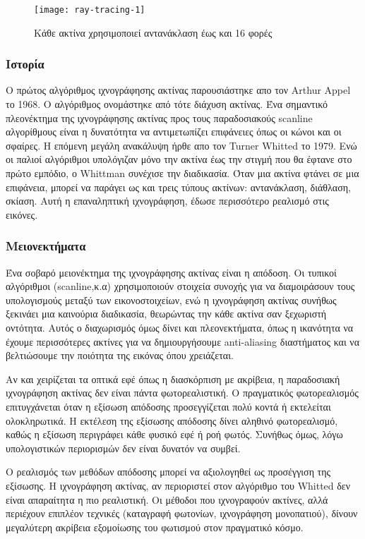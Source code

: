 \begin{figure}[h]
\centering
\texttt{[image: ray-tracing-1]}
\caption{Κάθε ακτίνα χρησιμοποιεί αντανάκλαση έως και 16 φορές}
\end{figure}

\subsubsection{Ιστορία}
Ο πρώτος αλγόριθμος ιχνογράφησης ακτίνας παρουσιάστηκε απο τον Arthur Appel το 1968. Ο αλγόριθμος ονομάστηκε από τότε διάχυση ακτίνας. Ένα σημαντικό πλεονέκτημα της ιχνογράφησης ακτίνας προς τους παραδοσιακούς scanline αλγορίθμους είναι η δυνατότητα να αντιμετωπίζει επιφάνειες όπως οι κώνοι και οι σφαίρες. Η επόμενη μεγάλη ανακάλυψη ήρθε απο τον Turner Whitted το 1979. Ενώ οι παλιοί αλγόριθμοι υπολόγιζαν μόνο την ακτίνα έως την στιγμή που θα έφτανε στο πρώτο εμπόδιο, ο Whittman συνέχισε την διαδικασία. Όταν μια ακτίνα φτάνει σε μια επιφάνεια, μπορεί να παράγει ως και τρεις τύπους ακτίνων: αντανάκλαση, διάθλαση, σκίαση. Αυτή η επαναληπτική ιχνογράφηση, έδωσε περισσότερο ρεαλισμό στις εικόνες.

\subsubsection{Μειονεκτήματα}
Ένα σοβαρό μειονέκτημα της ιχνογράφησης ακτίνας είναι η απόδοση. Οι τυπικοί αλγόριθμοι (scanline,κ.α) χρησιμοποιούν στοιχεία συνοχής για να διαμοιράσουν τους υπολογισμούς μεταξύ των εικονοστοιχείων, ενώ η ιχνογράφηση ακτίνας συνήθως ξεκινάει μια καινούρια διαδικασία, θεωρώντας την κάθε ακτίνα σαν ξεχωριστή οντότητα. Αυτός ο διαχωρισμός όμως δίνει και πλεονεκτήματα, όπως η ικανότητα να έχουμε περισσότερες ακτίνες για να δημιουργήσουμε anti-aliasing διαστήματος και να βελτιώσουμε την ποιότητα της εικόνας όπου χρειάζεται.

Αν και χειρίζεται τα οπτικά εφέ όπως η διασκόρπιση με ακρίβεια, η παραδοσιακή ιχνογράφηση ακτίνας δεν είναι πάντα φωτορεαλιστική. Ο πραγματικός φωτορεαλισμός επιτυγχάνεται όταν η εξίσωση απόδοσης προσεγγίζεται πολύ κοντά ή εκτελείται ολοκληρωτικά. Η εκτέλεση της εξίσωσης απόδοσης δίνει αληθινό φωτορεαλισμό, καθώς η εξίσωση περιγράφει κάθε φυσικό εφέ ή ροή φωτός. Συνήθως όμως, λόγω υπολογιστικών περιορισμών δεν είναι δυνατόν να συμβεί.

Ο ρεαλισμός των μεθόδων απόδοσης μπορεί να αξιολογηθεί ως προσέγγιση της εξίσωσης. Η ιχνογράφηση ακτίνας, αν περιοριστεί στον αλγόριθμο του Whitted δεν είναι απαραίτητα η πιο ρεαλιστική. Οι μέθοδοι που ιχνογραφούν ακτίνες, αλλά περιέχουν επιπλέον τεχνικές (καταγραφή φωτονίων, ιχνογράφηση μονοπατιού), δίνουν μεγαλύτερη ακρίβεια εξομοίωσης του φωτισμού στον πραγματικό κόσμο.

